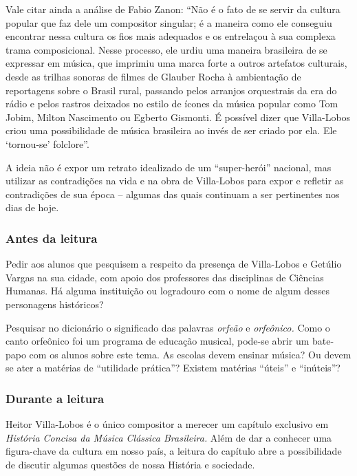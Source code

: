 \documentclass[11pt]{extarticle}
\begin{document}
Vale citar ainda a análise de Fabio Zanon: ``Não é o fato de se servir
da cultura popular que faz dele um compositor singular; é a maneira como
ele conseguiu encontrar nessa cultura os fios mais adequados e os
entrelaçou à sua complexa trama composicional. Nesse processo, ele urdiu
uma maneira brasileira de se expressar em música, que imprimiu uma marca
forte a outros artefatos culturais, desde as trilhas sonoras de filmes
de Glauber Rocha à ambientação de reportagens sobre o Brasil rural,
passando pelos arranjos orquestrais da era do rádio e pelos rastros
deixados no estilo de ícones da música popular como Tom Jobim, Milton
Nascimento ou Egberto Gismonti. É possível dizer que Villa-Lobos criou
uma possibilidade de música brasileira ao invés de ser criado por ela.
Ele `tornou-se' folclore''.

A ideia não é expor um retrato idealizado de um ``super-herói''
nacional, mas utilizar as contradições na vida e na obra de Villa-Lobos
para expor e refletir as contradições de sua época -- algumas das quais
continuam a ser pertinentes nos dias de hoje.


\subsubsection{Antes da leitura}

Pedir aos alunos que pesquisem a respeito da presença de Villa-Lobos e
Getúlio Vargas na sua cidade, com apoio dos professores das disciplinas de 
Ciências Humanas. Há alguma instituição ou logradouro com o
nome de algum desses personagens históricos?

Pesquisar no dicionário o significado das palavras \emph{orfeão} e
\emph{orfeônico.} Como o canto orfeônico foi um programa de educação
musical, pode-se abrir um bate-papo com os alunos sobre este tema. As
escolas devem ensinar música? Ou devem se ater a matérias de ``utilidade
prática''? Existem matérias ``úteis'' e ``inúteis''?

\subsubsection{Durante a leitura}

Heitor Villa-Lobos é o único compositor a merecer um capítulo exclusivo
em \emph{História Concisa da Música Clássica Brasileira.} Além de dar a
conhecer uma figura-chave da cultura em nosso país, a leitura do
capítulo abre a possibilidade de discutir algumas questões de nossa
História e sociedade.
\end{document}
